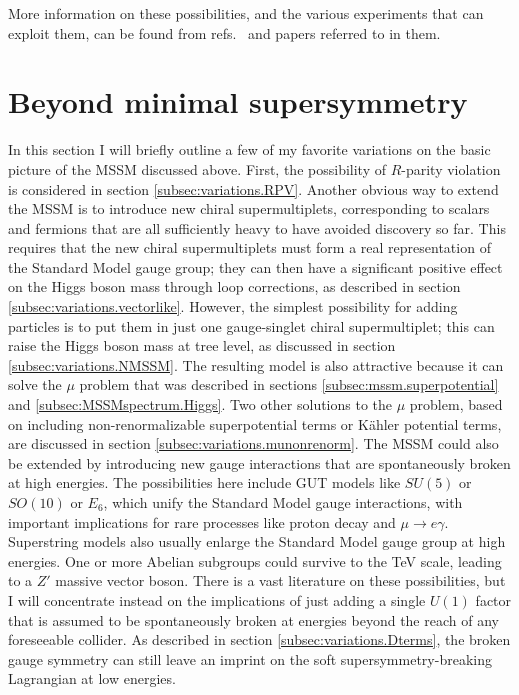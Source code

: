 \documentclass[11pt]{article}
\begin{document}
More information on these possibilities, and the various experiments that 
can exploit them, can be found from refs.~\cite{darkmatterreviews} and 
papers referred to in them.

\section{Beyond minimal supersymmetry}\label{sec:variations}
\setcounter{equation}{0}
\setcounter{figure}{0}
\setcounter{table}{0}
\setcounter{footnote}{1}

In this section I will briefly outline a few of my favorite variations 
on the basic picture of the MSSM discussed above. First, the possibility 
of $R$-parity violation is considered in section 
\ref{subsec:variations.RPV}. Another obvious way to extend the MSSM is 
to introduce new chiral supermultiplets, corresponding to scalars and 
fermions that are all sufficiently heavy to have avoided discovery so 
far. This requires that the new chiral supermultiplets must form a real 
representation of the Standard Model gauge group; they can then have a 
significant positive effect on the Higgs boson mass through loop 
corrections, as described in section \ref{subsec:variations.vectorlike}. 
However, the simplest possibility for adding particles is to put them in 
just one gauge-singlet chiral supermultiplet; this can raise the Higgs 
boson mass at tree level, as discussed in section 
\ref{subsec:variations.NMSSM}. The resulting model is also attractive 
because it can solve the $\mu$ problem that was described in sections 
\ref{subsec:mssm.superpotential} and \ref{subsec:MSSMspectrum.Higgs}. 
Two other solutions to the $\mu$ problem, based on including 
non-renormalizable superpotential terms or K\"ahler potential terms, are 
discussed in section \ref{subsec:variations.munonrenorm}. The MSSM could 
also be extended by introducing new gauge interactions that are 
spontaneously broken at high energies. The possibilities here include 
GUT models like $SU(5)$ or $SO(10)$ or $E_6$, which unify the Standard 
Model gauge interactions, with important implications for rare processes 
like proton decay and $\mu \rightarrow e \gamma$.  Superstring models 
also usually enlarge the Standard Model gauge group at high energies.  
One or more Abelian subgroups could survive to the TeV scale, leading to 
a $Z'$ massive vector boson. There is a vast literature on these 
possibilities, but I will concentrate instead on the implications of 
just adding a single $U(1)$ factor that is assumed to be spontaneously 
broken at energies beyond the reach of any foreseeable collider. As 
described in section \ref{subsec:variations.Dterms}, the broken gauge 
symmetry can still leave an imprint on the soft supersymmetry-breaking 
Lagrangian at low energies.
\end{document}
